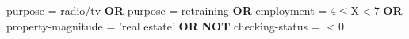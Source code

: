 purpose = radio/tv \textbf{OR} purpose = retraining \textbf{OR} employment = 4$\le$X$<$7 \textbf{OR} property-magnitude = 'real estate' \textbf{OR}  \textbf{NOT} checking-status = $<$0 \\

